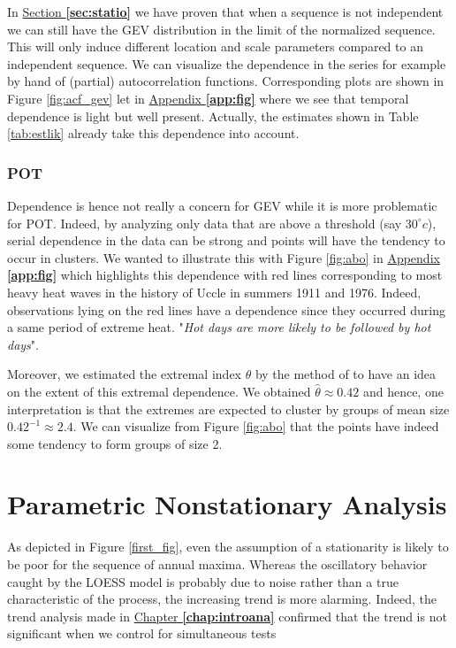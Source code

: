 In \hyperref[sec:statio]{Section \textbf{\ref{sec:statio}}} we have proven that when a sequence is not independent we can still have the GEV
distribution in the limit of the normalized sequence. This will only induce different location and scale
parameters compared to an independent sequence.
We can visualize the dependence in the series for example by hand of (partial) autocorrelation functions. Corresponding plots are shown in Figure \ref{fig:acf_gev} let in \hyperref[app:fig]{Appendix \textbf{\ref{app:fig}}} where we see that temporal dependence is light but well present. 
Actually, the estimates shown in Table \ref{tab:estlik} already take this dependence into account. 

\subsubsection*{POT}

 Dependence is hence not really a concern for GEV while it is more problematic for POT. Indeed, by analyzing only data that are above a threshold (say $30^{\circ}c$), serial dependence in the data can be strong and points will have the tendency to occur in clusters. We wanted to illustrate this with Figure \ref{fig:abo} in \hyperref[app:fig]{Appendix \textbf{\ref{app:fig}}} which highlights this dependence with red lines corresponding to most heavy heat waves in the history of Uccle in summers 1911 and 1976. Indeed, observations lying on the red lines have a dependence since they occurred during a same period of extreme heat. "\emph{Hot days are more likely to be followed by hot days}".
 
Moreover, we estimated the extremal index $\theta$ by the method of \citet{ferro_inference_2003} to have an idea on the extent of this extremal dependence. We obtained $\hat{\theta}\approx 0.42$ and hence, one interpretation is that the extremes are expected to cluster by groups of mean size $0.42^{-1}\approx 2.4$. We can visualize from Figure \ref{fig:abo} that the points have indeed some tendency to form groups of size 2.  



\section{Parametric Nonstationary Analysis}


As depicted in Figure \ref{first_fig}, even the assumption of a stationarity is likely to be poor for the sequence of annual maxima. 
Whereas the oscillatory behavior caught by the LOESS model is probably due to noise rather than a true characteristic of the process, the increasing trend is more alarming. Indeed, the trend analysis made in \hyperref[chap:introana]{Chapter \textbf{\ref{chap:introana}}} confirmed that the trend is not significant when we control for simultaneous tests

